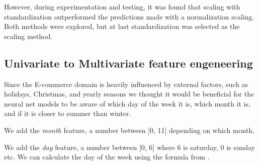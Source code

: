 However, during experimentation and testing, it was found that scaling with standardization
outperformed the predictions made with a normalization scaling.
Both methods were explored, but at last standardization was selected as the scaling method.

\subsection{Univariate to Multivariate feature engeneering}
Since the E-commerce domain is heavily influenced by external factors, such as
holidays, Christmas, and yearly seasons we thought it would be beneficial
for the neural net models to be aware of which day of the week it is,
which month it is, and if it is closer to summer than winter.

We add the \textit{month} feature, a number between [0, 11] depending on which month.

We add the \textit{day} feature, a number between [0, 6] where 6 is saturday, 0 is sunday etc.
We can calculate the day of the week using the formula 
from .

